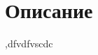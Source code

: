 \section{Описание}

\cite{vakbib1},dfvdfvscdc
\cite{vakbib2}
\cite{vakbib3}
\cite{bib1}
\cite{bib2}
\cite{bib3}
\cite{bib4}
\cite{bib5}
\clearpage
% 
% 

% 
% 
% 

